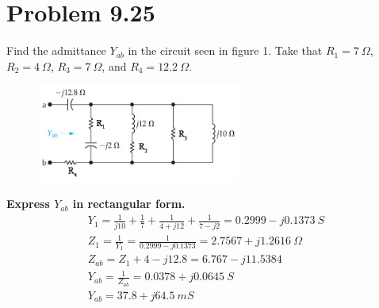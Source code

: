 \documentclass[12pt]{article}
\begin{document}
    \section*{Problem 9.25}
    Find the admittance $Y_{ab}$ in the circuit seen in figure 1. Take that
    $R_1 = 7\ \Omega$, $R_2 = 4\ \Omega$, $R_3 = 7\ \Omega$, and $R_4 = 12.2\
    \Omega$.
    \begin{figure}[h]
        \centering
        \includegraphics[width=0.6\textwidth]{9.25 Circuit.png}
    \end{figure}
    \textbf{Express $Y_{ab}$ in rectangular form.}
    \begin{gather*}
        Y_1 = \frac{1}{j 10} + \frac{1}{7} + \frac{1}{4 + j 12} + \frac{1}{7 - j
        2} = 0.2999 - j 0.1373\ S \\
        Z_1 = \frac{1}{Y_1} = \frac{1}{0.2999 - j 0.1373} = 2.7567 + j 1.2616\
        \Omega \\
        Z_{ab} = Z_1 + 4 - j 12.8 = 6.767 - j 11.5384 \\
        Y_{ab} = \frac{1}{Z_{ab}} = 0.0378 + j 0.0645\ S \\
        \boxed{Y_{ab} = 37.8 + j 64.5\ mS}
    \end{gather*}
    \newpage
\end{document}
